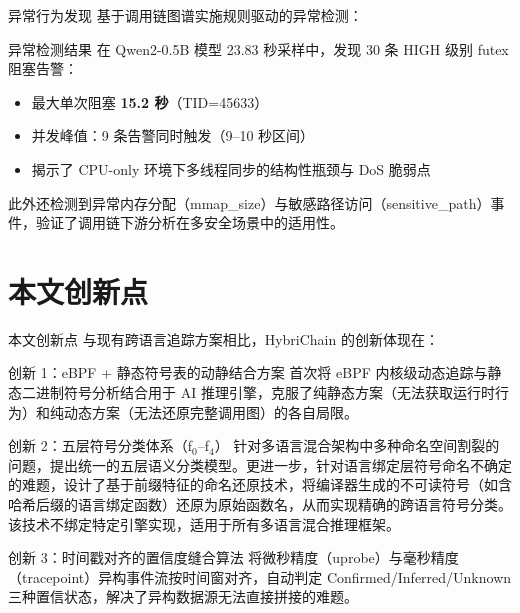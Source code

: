 \documentclass[aspectratio=169, 10pt]{beamer}
\begin{document}
\begin{frame}{异常行为发现}
    基于调用链图谱实施规则驱动的异常检测：

    \begin{alertblock}{异常检测结果}
        在 Qwen2-0.5B 模型 23.83 秒采样中，发现 30 条 HIGH 级别 futex 阻塞告警：
        \begin{itemize}
            \item 最大单次阻塞 \textbf{15.2 秒}（TID=45633）
            \item 并发峰值：9 条告警同时触发（9--10 秒区间）
            \item 揭示了 CPU-only 环境下多线程同步的结构性瓶颈与 DoS 脆弱点
        \end{itemize}
    \end{alertblock}

    \vspace{0.5em}
    此外还检测到异常内存分配（mmap\_size）与敏感路径访问（sensitive\_path）事件，验证了调用链下游分析在多安全场景中的适用性。
\end{frame}

\section{本文创新点}
\begin{frame}{本文创新点}
    与现有跨语言追踪方案相比，HybriChain 的创新体现在：

    \begin{block}{创新 1：eBPF + 静态符号表的动静结合方案}
        首次将 eBPF 内核级动态追踪与静态二进制符号分析结合用于 AI 推理引擎，克服了纯静态方案（无法获取运行时行为）和纯动态方案（无法还原完整调用图）的各自局限。
    \end{block}

    \begin{block}{创新 2：五层符号分类体系（f$_0$–f$_4$）}
        针对多语言混合架构中多种命名空间割裂的问题，提出统一的五层语义分类模型。更进一步，针对语言绑定层符号命名不确定的难题，设计了基于前缀特征的命名还原技术，将编译器生成的不可读符号（如含哈希后缀的语言绑定函数）还原为原始函数名，从而实现精确的跨语言符号分类。该技术不绑定特定引擎实现，适用于所有多语言混合推理框架。
    \end{block}

    \begin{block}{创新 3：时间戳对齐的置信度缝合算法}
        将微秒精度（uprobe）与毫秒精度（tracepoint）异构事件流按时间窗对齐，自动判定 Confirmed/Inferred/Unknown 三种置信状态，解决了异构数据源无法直接拼接的难题。
    \end{block}
\end{frame}
\end{document}
